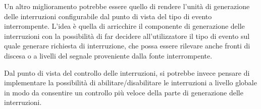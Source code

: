 \documentclass[12pt,a4paper,twoside,openany]{book}
\begin{document}
Un altro miglioramento potrebbe essere quello di rendere l'unità di generazione delle interruzioni configurabile dal punto di vista del tipo di evento interrompente. L'idea è quella di arricchire il componente di generazione delle interruzioni con la possibilità di far decidere all'utilizzatore il tipo di evento sul quale generare richiesta di interruzione, che possa essere rilevare anche fronti di discesa o a livelli del segnale proveniente dalla fonte interrompente.

Dal punto di vista del controllo delle interruzioni, si potrebbe invece pensare di implementare la possibilità di abilitare/disabilitare le interruzioni a livello globale in modo da consentire un controllo più veloce della parte di generazione delle interruzioni.
\end{document}
